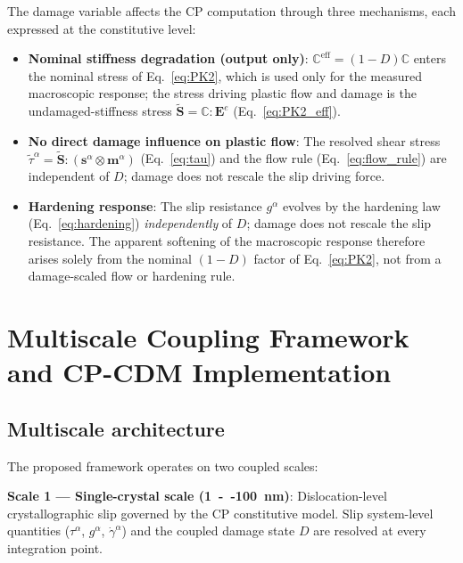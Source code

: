The damage variable affects the CP computation through three mechanisms, each expressed at the constitutive level:
\begin{itemize}
    \item \textbf{Nominal stiffness degradation (output only)}: $\mathbb{C}^{\text{eff}} = (1-D)\mathbb{C}$ enters the nominal stress of Eq.~\eqref{eq:PK2}, which is used only for the measured macroscopic response; the stress driving plastic flow and damage is the undamaged-stiffness stress $\tilde{\mathbf{S}} = \mathbb{C}:\mathbf{E}^e$ (Eq.~\eqref{eq:PK2_eff}).
    \item \textbf{No direct damage influence on plastic flow}: The resolved shear stress $\tilde{\tau}^\alpha = \tilde{\mathbf{S}}:(\mathbf{s}^\alpha\otimes\mathbf{m}^\alpha)$ (Eq.~\eqref{eq:tau}) and the flow rule (Eq.~\eqref{eq:flow_rule}) are independent of $D$; damage does not rescale the slip driving force.
    \item \textbf{Hardening response}: The slip resistance $g^\alpha$ evolves by the hardening law (Eq.~\eqref{eq:hardening}) \emph{independently} of $D$; damage does not rescale the slip resistance. The apparent softening of the macroscopic response therefore arises solely from the nominal $(1-D)$ factor of Eq.~\eqref{eq:PK2}, not from a damage-scaled flow or hardening rule.
\end{itemize}

\section{Multiscale Coupling Framework and CP-CDM Implementation}
\label{sec:multiscale}

\subsection{Multiscale architecture}

The proposed framework operates on two coupled scales:

\noindent\textbf{Scale 1 --- Single-crystal scale (\SI{1}{--}\SI{100}{\nano\meter})}: Dislocation-level crystallographic slip governed by the CP constitutive model. Slip system-level quantities ($\tau^\alpha$, $g^\alpha$, $\dot{\gamma}^\alpha$) and the coupled damage state $D$ are resolved at every integration point.
    
